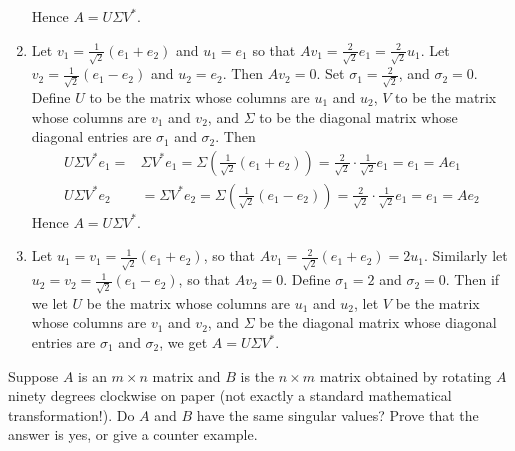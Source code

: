 \documentclass[12pt]{article}
\newenvironment{ex}[2][Exercise]{\begin{trivlist}
		\item[\hskip \labelsep {\bfseries #1}\hskip \labelsep {\bfseries #2.}]}{\end{trivlist}}
\newenvironment{sol}[1][Solution]{\begin{trivlist}
		\item[\hskip \labelsep {\bfseries #1:}]}{\end{trivlist}}
\begin{document}
\begin{sol}
\begin{enumerate}[label=(\alph*)]
		Hence $A=U\Sigma V^*$.
		\item Let $v_1=\frac{1}{\sqrt{2}}(e_1 + e_2)$ and $u_1=e_1$ so that $Av_1 = \frac{2}{\sqrt{2}}e_1
		=\frac{2}{\sqrt{2}}u_1$. Let $v_2=\frac{1}{\sqrt{2}}(e_1-e_2)$ and $u_2=e_2$. Then
		$Av_2=0$. Set $\sigma_1=\frac{2}{\sqrt{2}}$, and $\sigma_2=0$. Define $U$ to be the matrix whose
		columns are $u_1$ and $u_2$, $V$ to be the matrix whose columns are $v_1$ and $v_2$, and
		$\Sigma$ to be the diagonal matrix whose diagonal entries are $\sigma_1$ and $\sigma_2$. Then
		\begin{align*}
			U\Sigma V^*e_1=&\Sigma V^*e_1=\Sigma \left(\frac{1}{\sqrt{2}}(e_1+e_2)\right)=\frac{2}{\sqrt{2}}\cdot  \frac{1}{\sqrt{2}}e_1=e_1=Ae_1\\
			U\Sigma V^*e_2&=\Sigma V^*e_2=\Sigma \left(\frac{1}{\sqrt{2}}(e_1-e_2)\right)=\frac{2}{\sqrt{2}}\cdot \frac{1}{\sqrt{2}}e_1=e_1=Ae_2
		\end{align*}
		Hence $A=U\Sigma V^*$.
		\item Let $u_1=v_1=\frac{1}{\sqrt{2}}(e_1+e_2)$, so that $Av_1=\frac{2}{\sqrt{2}}(e_1+e_2)=2u_1$.
		Similarly let $u_2=v_2=\frac{1}{\sqrt{2}}(e_1-e_2)$, so that $Av_2=0$. Define $\sigma_1=2$ and
		$\sigma_2=0$. Then if we let $U$ be the matrix whose columns are $u_1$ and $u_2$, let $V$ be the
		matrix whose columns are $v_1$ and $v_2$, and $\Sigma$ be the diagonal matrix whose diagonal entries
		are $\sigma_1$ and $\sigma_2$, we get $A=U\Sigma V^*$.
	\end{enumerate}
\end{sol}

\begin{ex}{4.2}
	Suppose $A$ is an $m\times n$ matrix and $B$ is the $n\times m$ matrix obtained by rotating $A$
	ninety degrees clockwise on paper (not exactly a standard mathematical transformation!). Do $A$
	and $B$ have the same singular values? Prove that the answer is yes, or give a counter example.
\end{ex}
\end{document}
